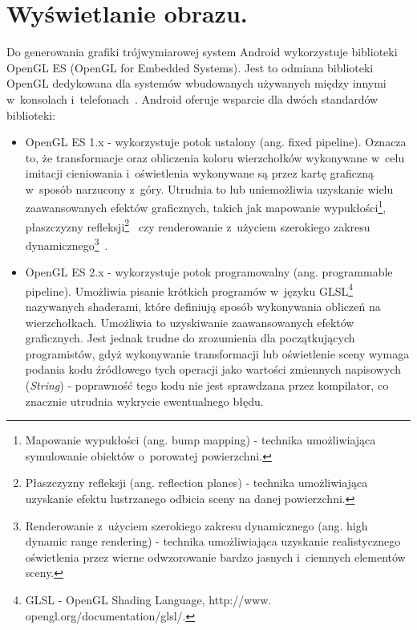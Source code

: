 \documentclass[a4paper,twocolumn,11pt]{article}
\begin{document}

\section{Wyświetlanie obrazu.} \label{sec:image_rendering}

Do generowania grafiki trójwymiarowej system Android wykorzystuje biblioteki OpenGL ES (OpenGL for Embedded Systems).
Jest to odmiana biblioteki OpenGL dedykowana dla systemów wbudowanych używanych między innymi w~konsolach i~telefonach~\cite{ogl:es}.
Android oferuje wsparcie dla dwóch standardów biblioteki:

\begin{itemize}
 \item OpenGL ES 1.x - wykorzystuje potok ustalony (ang. fixed pipeline).
  Oznacza to, że transformacje oraz obliczenia koloru wierzchołków wykonywane w~celu imitacji cieniowania i~oświetlenia wykonywane są przez kartę graficzną w~sposób narzucony z~góry.
  Utrudnia to lub uniemożliwia uzyskanie wielu zaawansowanych efektów graficznych, takich jak mapowanie wypukłości\footnote{Mapowanie wypukłości (ang. bump mapping) - technika umożliwiająca symulowanie obiektów o~porowatej powierzchni.}, płaszczyzny refleksji\footnote{Płaszczyzny refleksji (ang. reflection planes) - technika umożliwiająca uzyskanie efektu lustrzanego odbicia sceny na danej powierzchni.}~\cite{tec:3d} czy renderowanie z~użyciem szerokiego zakresu dynamicznego\footnote{Renderowanie z~użyciem szerokiego zakresu dynamicznego (ang. high dynamic range rendering) - technika umożliwiająca uzyskanie realistycznego oświetlenia przez wierne odwzorowanie bardzo jasnych i~ciemnych elementów sceny.}~\cite{nvi:hdr}. 
 \item OpenGL ES 2.x - wykorzystuje potok programowalny (ang. programmable pipeline).
  Umożliwia pisanie krótkich programów w~języku GLSL\footnote{GLSL - OpenGL Shading Language, http://www.\\opengl.org/documentation/glsl/.} nazywanych shaderami, które definiują sposób wykonywania obliczeń na wierzchołkach.
  Umożliwia to uzyskiwanie zaawansowanych efektów graficznych. Jest jednak trudne do zrozumienia dla początkujących programistów, gdyż wykonywanie transformacji lub oświetlenie sceny wymaga podania kodu źródłowego tych operacji jako wartości zmiennych napisowych (\emph{String}) - poprawność tego kodu nie jest sprawdzana przez kompilator, co znacznie utrudnia wykrycie ewentualnego błędu.
\end{itemize}
\end{document}
